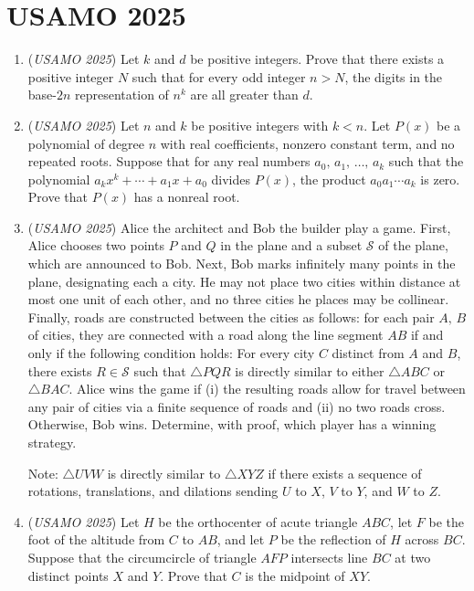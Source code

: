 \section{USAMO 2025}
        \begin{enumerate}
        	\item (\textit{USAMO 2025}) Let $k$ and $d$ be positive integers. Prove that there exists a positive integer $N$ such that for every odd integer $n>N$, the digits in the base-$2n$ representation of $n^k$ are all greater than $d$.


 

	\item (\textit{USAMO 2025}) Let $n$ and $k$ be positive integers with $k<n$. Let $P(x)$ be a polynomial of degree $n$ with real coefficients, nonzero constant term, and no repeated roots. Suppose that for any real numbers $a_0,\,a_1,\,\ldots,\,a_k$ such that the polynomial $a_kx^k+\cdots+a_1x+a_0$ divides $P(x)$, the product $a_0a_1\cdots a_k$ is zero. Prove that $P(x)$ has a nonreal root.


 

	\item (\textit{USAMO 2025}) Alice the architect and Bob the builder play a game. First, Alice chooses two points $P$ and $Q$ in the plane and a subset $\mathcal{S}$ of the plane, which are announced to Bob. Next, Bob marks infinitely many points in the plane, designating each a city. He may not place two cities within distance at most one unit of each other, and no three cities he places may be collinear. Finally, roads are constructed between the cities as follows: for each pair $A,\,B$ of cities, they are connected with a road along the line segment $AB$ if and only if the following condition holds:
For every city $C$ distinct from $A$ and $B$, there exists $R\in\mathcal{S}$ such
that $\triangle PQR$ is directly similar to either $\triangle ABC$ or $\triangle BAC$.
Alice wins the game if (i) the resulting roads allow for travel between any pair of cities via a finite sequence of roads and (ii) no two roads cross. Otherwise, Bob wins. Determine, with proof, which player has a winning strategy.


 Note: $\triangle UVW$ is directly similar to $\triangle XYZ$ if there exists a sequence of rotations, translations, and dilations sending $U$ to $X$, $V$ to $Y$, and $W$ to $Z$.


 

	\item (\textit{USAMO 2025}) Let $H$ be the orthocenter of acute triangle $ABC$, let $F$ be the foot of the altitude from $C$ to $AB$, and let $P$ be the reflection of $H$ across $BC$. Suppose that the circumcircle of triangle $AFP$ intersects line $BC$ at two distinct points $X$ and $Y$. Prove that $C$ is the midpoint of $XY$.



\end{enumerate}
